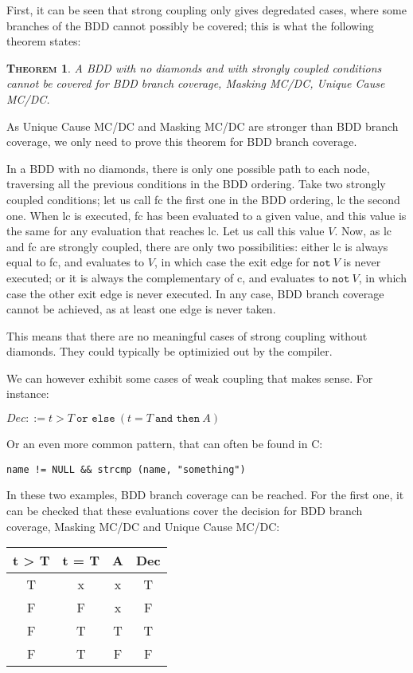 \documentclass[a4paper,12pt,twoside]{article}
\newcommand{\andthen}{\texttt{and then}}
\newcommand{\orelse}{\texttt{or else}}
\newcommand{\adanot}{\texttt{not}}
\newtheorem{theorem}{\textsc{Theorem}}
\begin{document}
First, it can be seen that strong coupling only gives degredated cases,
where some branches of the BDD cannot possibly be covered; this is
what the following theorem states:

\begin{theorem}
  \label{thm:strong-coupling-no-diamond}
  A BDD with no diamonds and with strongly coupled conditions cannot be
  covered for BDD branch coverage, Masking MC/DC, Unique Cause MC/DC.
\end{theorem}

As Unique Cause MC/DC and Masking MC/DC are stronger than BDD branch
coverage, we only need to prove this theorem for BDD branch coverage.

In a BDD with no diamonds, there is only one possible path to each
node, traversing all the previous conditions in the BDD ordering. Take
two strongly coupled conditions; let us call fc the first one in the
BDD ordering, lc the second one. When lc is executed, fc has been
evaluated to a given value, and this value is the same for any
evaluation that reaches lc. Let us call this value $V$. Now, as lc and
fc are strongly coupled, there are only two possibilities: either lc
is always equal to fc, and evaluates to $V$, in which case the exit edge
for $\adanot{} \ V$ is never executed; or it is always the
complementary of c, and evaluates to $\adanot{} \ V$, in which case
the other exit edge is never executed. In any case, BDD branch
coverage cannot be achieved, as at least one edge is never taken.

This means that there are no meaningful cases of strong coupling
without diamonds. They could typically be optimizied out by the
compiler.

We can however exhibit some cases of weak coupling that makes sense.
For instance:

$Dec ::= t > T \ \orelse{} \ (t = T \ \andthen{} \ A)$

Or an even more common pattern, that can often be found in C:

\verb|name != NULL && strcmp (name, "something")|

In these two examples, BDD branch coverage can be reached. For the first
one, it can be checked that these evaluations cover the decision for
BDD branch coverage, Masking MC/DC and Unique Cause MC/DC:

\begin{center}
\begin{tabular}{|c|c|c||c|}
\hline
t > T & t = T & A & Dec \\ \hline
T     & x     & x & T \\ \hline
F     & F     & x & F \\ \hline
F     & T     & T & T \\ \hline
F     & T     & F & F \\ \hline
\end{tabular}
\end{center}
\end{document}
